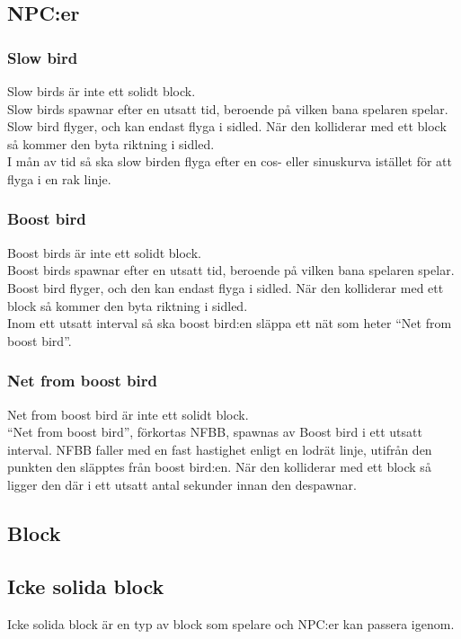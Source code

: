 \documentclass{TDP003mall}
\begin{document}
\subsection{NPC:er}
\subsubsection{Slow bird}
Slow birds är inte ett solidt block. \\
Slow birds spawnar efter en utsatt tid, beroende på vilken bana spelaren spelar. Slow bird flyger, och kan endast flyga i sidled. När den kolliderar med ett block så kommer den byta riktning i sidled. \\
I mån av tid så ska slow birden flyga efter en cos- eller sinuskurva istället för att flyga i en rak linje.

\subsubsection{Boost bird}
Boost birds är inte ett solidt block. \\
Boost birds spawnar efter en utsatt tid, beroende på vilken bana spelaren spelar. Boost bird flyger, och den kan endast flyga i sidled. När den kolliderar med ett block så kommer den byta riktning i sidled. \\
Inom ett utsatt interval så ska boost bird:en släppa ett nät som heter ``Net from boost bird''.

\subsubsection{Net from boost bird}
Net from boost bird är inte ett solidt block. \\
``Net from boost bird'', förkortas NFBB, spawnas av Boost bird i ett utsatt interval. NFBB faller med en fast hastighet enligt en lodrät linje, utifrån den punkten den släpptes från boost bird:en. När den kolliderar med ett block så ligger den där i ett utsatt antal sekunder innan den despawnar.

\subsection{Block}

\subsection{Icke solida block}
Icke solida block är en typ av block som spelare och NPC:er kan passera igenom.
\end{document}
